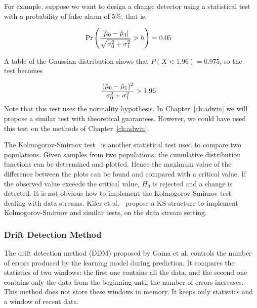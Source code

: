 For example, suppose we want to design a change detector using a statistical test
with a probability of false alarm of $5\%$, that is,

$$\Pr \left( \frac{|\hat{\mu}_0 - \hat{\mu}_1|}{\sqrt{\sigma_0^2+ \sigma_1^2}} > h \right) = 0.05$$

A table of the Gaussian distribution shows that $P( X< 1.96) = 0.975$, so the test becomes

$$\frac{(\hat{\mu}_0 - \hat{\mu}_1)^ 2}{{\sigma_0^2+ \sigma_1^2}} > 1.96$$
Note that this test uses the normality hypothesis. In Chapter~\ref{ch:adwin} we will propose a similar test with
theoretical guarantees. However, 
we could have used this test on the methods of Chapter~\ref{ch:adwin}.

The Kolmogorov-Smirnov test~\cite{Kanji} is another statistical test used to compare two populations.
Given samples %
from two populations, the cumulative distribution functions %
can be determined and plotted. Hence the maximum value of the difference between the plots can be found and compared with a critical value. If the
observed value exceeds the critical value, %
$H_0$ is rejected and a change is detected. It is not obvious how to implement the  Kolmogorov-Smirnov test dealing with data streams. Kifer et al.~\cite{kifer-detecting} propose a KS-structure to implement Kolmogorov-Smirnov and similar tests, on the data stream setting.

\subsubsection{Drift Detection Method}
\label{SsDDM}

The drift detection method (DDM) proposed by Gama et al.  \cite{Gama} controls the number of errors produced by
the learning model during prediction. %
It compares the statistics of two windows: the first one contains all the data, and the second one contains only the data from the beginning until the number of errors increases. This method does not store these windows in memory. It keeps only statistics and a window of recent data.%

